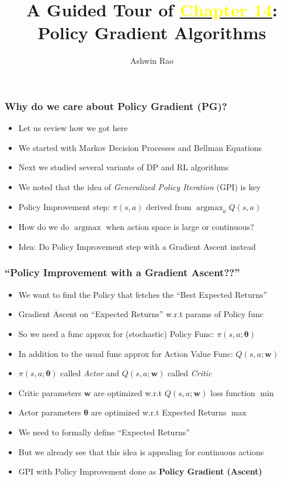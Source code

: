 \documentclass[handout]{beamer}
\title[Policy Gradient Chapter]{A Guided Tour of \href{http://stanford.edu/~ashlearn/RLForFinanceBook/book.pdf}{\underline{\textcolor{yellow}{Chapter 14}}}: \\ Policy Gradient Algorithms} %
\author{Ashwin Rao} %
\institute[Stanford] %
{ICME, Stanford University
}
\date{} %
\DeclareMathOperator*{\argmax}{argmax}
\begin{document}
\begin{frame}
\titlepage %
\end{frame}

\begin{frame}
\frametitle{Why do we care about Policy Gradient (PG)?}
\pause
\begin{itemize}[<+->]
\item Let us review how we got here
\item We started with Markov Decision Processes and Bellman Equations
\item Next we studied several variants of DP and RL algorithms
\item We noted that the idea of {\em Generalized Policy Iteration} (GPI) is key
\item Policy Improvement step: $\pi(s, a)$ derived from $\argmax_a Q(s, a)$
\item How do we do $\argmax$ when action space is large or continuous?
\item Idea: Do Policy Improvement step with a Gradient Ascent instead
\end{itemize}
\end{frame}

\begin{frame}
\frametitle{``Policy Improvement with a Gradient Ascent??''}
\pause
\begin{itemize}[<+->]
\item We want to find the Policy that fetches the ``Best Expected Returns''
\item Gradient Ascent on ``Expected Returns'' w.r.t params of Policy func
\item So we need a func approx for (stochastic) Policy Func: $\pi(s, a; \bm{\theta})$
\item In addition to the usual func approx for Action Value Func: $Q(s, a; \bm{w})$
\item $\pi(s, a; \bm{\theta})$ called {\em Actor} and $Q(s, a; \bm{w})$ called {\em Critic}
\item Critic parameters $\bm{w}$ are optimized w.r.t $Q(s, a; \bm{w})$ loss function $\min$
\item Actor parameters $\bm{\theta}$ are optimized w.r.t Expected Returns $\max$
\item We need to formally define ``Expected Returns''
\item But we already see that this idea is appealing for continuous actions
\item GPI with Policy Improvement done as {\bf Policy Gradient (Ascent)}
\end{itemize}
\end{frame}
\end{document}
